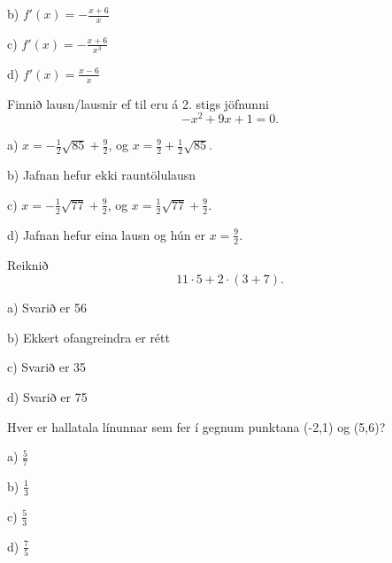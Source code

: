 b) \hspace{2mm} $\displaystyle f'(x)=-\frac{x+6}{x}$

c) \hspace{2mm} $\displaystyle f'(x)=-\frac{x+6}{x^3}$ %

d) \hspace{2mm} $\displaystyle f'(x)=\frac{x-6}{x}$


\item Finnið lausn/lausnir ef til eru á 2. stigs jöfnunni $$- x^{2} + 9 x + 1=0.$$

a) $x = - \frac{1}{2} \sqrt{85} + \frac{9}{2}$, og $x=\frac{9}{2} + \frac{1}{2} \sqrt{85}$. %

b) Jafnan hefur ekki rauntölulausn

c) $x = - \frac{1}{2} \sqrt{77} + \frac{9}{2}$, og $x=\frac{1}{2} \sqrt{77} + \frac{9}{2}$.

d) Jafnan hefur eina lausn og hún er $x=\frac{9}{2}$.


\item Reiknið
$$
11 \cdot 5+2 \cdot  \left ( 3+7 \right ) .
$$
\newpage

a) Svarið er 56

b) Ekkert ofangreindra er rétt

c) Svarið er 35

d) Svarið er 75 %


\item Hver er hallatala línunnar sem fer í gegnum punktana (-2,1) og (5,6)?

a) \hspace{2mm} $\displaystyle\frac{5}{7}$ %

b) \hspace{2mm} $\displaystyle\frac{1}{3}$

c) \hspace{2mm} $\displaystyle\frac{5}{3}$

d) \hspace{2mm} $\displaystyle\frac{7}{5}$


